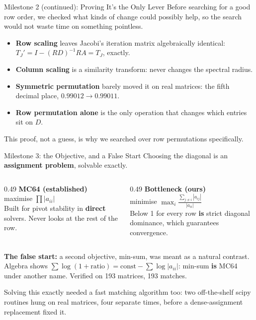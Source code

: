 \documentclass[aspectratio=169,10pt]{beamer}
\renewcommand{\emph}[1]{{\color{LSteal}\bfseries #1}}
\begin{document}
\begin{frame}{Milestone 2 (continued): Proving It's the Only Lever}
  \small
  Before searching for a good row order, we checked what kinds of change could
  possibly help, so the search would not waste time on something pointless.
  \vspace{0.4em}
  \begin{itemize}\setlength\itemsep{0.4em}
    \item \textbf{Row scaling} leaves Jacobi's iteration matrix algebraically
      identical: $T_J' = I - (RD)^{-1}RA = T_J$, exactly.
    \item \textbf{Column scaling} is a similarity transform: never changes the
      spectral radius.
    \item \textbf{Symmetric permutation} barely moved it on real matrices: the
      fifth decimal place, $0.99012 \to 0.99011$.
    \item \textbf{Row permutation alone} is the only operation that changes which
      entries sit on $D$.
  \end{itemize}
  \vspace{0.4em}
  \footnotesize\color{LSgray}
  This proof, not a guess, is why we searched over row permutations specifically.
\end{frame}

\begin{frame}{Milestone 3: the Objective, and a False Start}
  \small
  Choosing the diagonal is an \emph{assignment problem}, solvable exactly.
  \vspace{0.3em}
  \begin{columns}[T]
    \begin{column}{0.49\textwidth}
      \textbf{\color{LSteal}MC64 (established)}\\[0.15em]
      \footnotesize maximise $\prod |a_{ii}|$\\[0.3em]
      Built for pivot stability in \emph{direct} solvers. Never looks at the rest
      of the row.
    \end{column}
    \begin{column}{0.49\textwidth}
      \textbf{\color{LSteal}Bottleneck (ours)}\\[0.15em]
      \footnotesize minimise $\displaystyle\max_i \frac{\sum_{j\ne i}|a_{ij}|}{|a_{ii}|}$\\[0.3em]
      Below 1 for every row \textbf{is} strict diagonal dominance, which
      guarantees convergence.
    \end{column}
  \end{columns}
  \vspace{0.5em}
  \colorbox{LSlightgold}{\parbox{0.96\linewidth}{\footnotesize
  \textbf{The false start:} a second objective, min-sum, was meant as a natural
  contrast. Algebra shows $\sum\log(1{+}\text{ratio}) = \text{const} - \sum\log|a_{ii}|$:
  min-sum \textbf{is} MC64 under another name. Verified on 193 matrices, 193 matches.}}
  \vspace{0.4em}
  \footnotesize\color{LSgray}Solving this exactly needed a fast matching algorithm too:
  two off-the-shelf scipy routines hung on real matrices, four separate times, before
  a dense-assignment replacement fixed it.
\end{frame}
\end{document}

